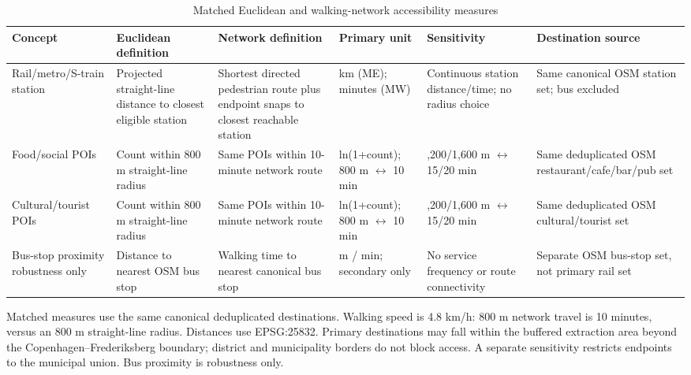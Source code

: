 \begin{landscape}
\begin{table}[p]\centering\small
\begin{threeparttable}
\caption{Matched Euclidean and walking-network accessibility measures}\label{tab:accessibility-definitions}
\begin{tabularx}{\linewidth}{>{\raggedright\arraybackslash}p{2.8cm}XX>{\raggedright\arraybackslash}p{2.7cm}>{\raggedright\arraybackslash}p{3.0cm}>{\raggedright\arraybackslash}p{3.4cm}}
\toprule
Concept & Euclidean definition & Network definition & Primary unit & Sensitivity & Destination source \\
\midrule
Rail/metro/S-train station & Projected straight-line distance to closest eligible station & Shortest directed pedestrian route plus endpoint snaps to closest reachable station & km (ME); minutes (MW) & Continuous station distance/time; no radius choice & Same canonical OSM station set; bus excluded \\
Food/social POIs & Count within 800 m straight-line radius & Same POIs within 10-minute network route & ln(1+count); 800 m $\leftrightarrow$ 10 min & 1,200/1,600 m $\leftrightarrow$ 15/20 min & Same deduplicated OSM restaurant/cafe/bar/pub set \\
Cultural/tourist POIs & Count within 800 m straight-line radius & Same POIs within 10-minute network route & ln(1+count); 800 m $\leftrightarrow$ 10 min & 1,200/1,600 m $\leftrightarrow$ 15/20 min & Same deduplicated OSM cultural/tourist set \\
Bus-stop proximity \textemdash{} robustness only & Distance to nearest OSM bus stop & Walking time to nearest canonical bus stop & m / min; secondary only & No service frequency or route connectivity & Separate OSM bus-stop set, not primary rail set \\
\bottomrule
\end{tabularx}
\begin{tablenotes}[flushleft]\footnotesize
\item Matched measures use the same canonical deduplicated destinations. Walking speed is 4.8 km/h: 800 m network travel is 10 minutes, versus an 800 m straight-line radius. Distances use EPSG:25832. Primary destinations may fall within the buffered extraction area beyond the Copenhagen--Frederiksberg boundary; district and municipality borders do not block access. A separate sensitivity restricts endpoints to the municipal union. Bus proximity is robustness only.
\end{tablenotes}\end{threeparttable}\end{table}\end{landscape}
